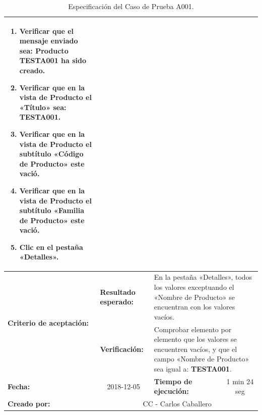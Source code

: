 \begin{table}
\begin{tabular}{|p{2.5cm}|p{2.8cm}|p{2.2cm}|p{2.8cm}|p{2.2cm}|}
{{\begin{enumerate}
\item Verificar que el mensaje enviado sea: \textbf{Producto TESTA001 ha sido creado}.
\item Verificar que en la vista de Producto el «Título» sea: \textbf{TESTA001}.
\item Verificar que en la vista de Producto el subtítulo «Código de Producto» este vació.
\item Verificar que en la vista de Producto el subtítulo «Familia de Producto» este vació.
\item Clic en el pestaña «Detalles».
\end{enumerate}
\vspace{-5mm}
}} \\
\hline
\multirow{2}{2.8cm}{\footnotesize{\textbf{Criterio de aceptación:}}} &
\footnotesize{\textbf{Resultado esperado:}} &
\multicolumn{3}{p{9.1cm}|}{\footnotesize{En la pestaña «Detalles», todos los
valores exceptuando el «Nombre de Producto» se encuentran con los valores
vacíos.}} \\
\cline{2-5}
& \footnotesize{\textbf{Verificación:}} &
\multicolumn{3}{p{9.1cm}|}{\footnotesize{Comprobar elemento por elemento que los
valores se encuentren vacíos, y que el campo «Nombre de Producto» sea igual a:
\textbf{TESTA001}.}} \\
\hline
\footnotesize{\textbf{Fecha:}} &
\multicolumn{1}{c|}{\footnotesize{2018-12-05}} &
\multicolumn{2}{l|}{\footnotesize{\textbf{Tiempo de ejecución:}}} &
\multicolumn{1}{c|}{\footnotesize{1 min 24 seg}} \\
\hline
\footnotesize{\textbf{Creado por:}} &
\multicolumn{4}{c|}{\footnotesize{CC - Carlos Caballero}} \\
\hline
\end{tabular}
\caption{Especificación del Caso de Prueba A001.}
\label{lltc}
\end{table}

